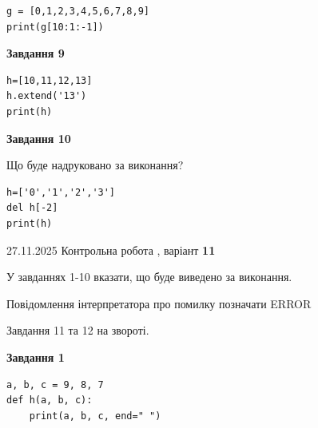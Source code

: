 \documentclass[12pt, ukrainian]{article}
\begin{document}
{{{{{{{{{{{\begin{minipage}[t]{10.5cm}
\begin{verbatim}
g = [0,1,2,3,4,5,6,7,8,9]
print(g[10:1:-1])
\end{verbatim}



\begin{center}
\textbf{Завдання 9}
\end{center}

\begin{verbatim}
h=[10,11,12,13]
h.extend('13')
print(h)
\end{verbatim}



\begin{center}
\textbf{Завдання 10}
\end{center}
Що буде надруковано за виконання?\par
\begin{verbatim}
h=['0','1','2','3']
del h[-2]
print(h)
\end{verbatim}

\end{minipage}

}
\newpage

{{ 27.11.2025 Контрольна робота , варіант  \No \textbf { 11 }\par}}
{

{%



У завданнях 1-10 вказати, що буде виведено за виконання.

Повідомлення інтерпретатора про помилку позначати ERROR

Завдання 11 та 12 на звороті.

\begin{minipage}[t]{7.5cm}

\begin{center}
\textbf{Завдання 1}
\end{center}

\begin{verbatim}
a, b, c = 9, 8, 7
def h(a, b, c):
    print(a, b, c, end=" ")


\end{verbatim}
\end{minipage}}}}}}}}}}}}}
\end{document}
